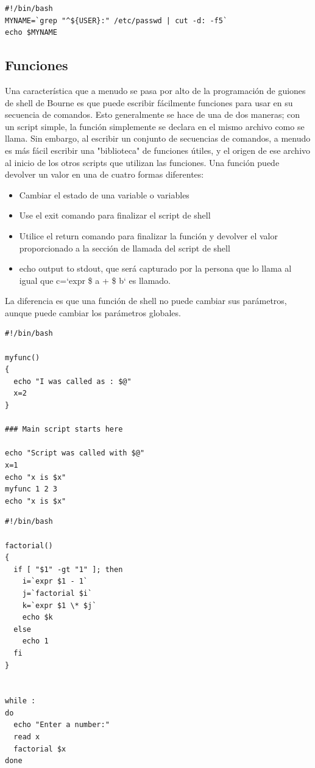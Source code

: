 \documentclass{article}
\begin{document}
\begin{verbatim}
#!/bin/bash
MYNAME=`grep "^${USER}:" /etc/passwd | cut -d: -f5`
echo $MYNAME
\end{verbatim}

\subsection{Funciones}
Una característica que a menudo se pasa por alto de la programación de guiones de shell de Bourne es que puede escribir fácilmente funciones para usar en su secuencia de comandos. Esto generalmente se hace de una de dos maneras; con un script simple, la función simplemente se declara en el mismo archivo como se llama. 
Sin embargo, al escribir un conjunto de secuencias de comandos, a menudo es más fácil escribir una "biblioteca" de funciones útiles, y el origen de ese archivo al inicio de los otros scripts que utilizan las funciones.
Una función puede devolver un valor en una de cuatro formas diferentes:
\begin{itemize}
\item Cambiar el estado de una variable o variables
\item Use el exit comando para finalizar el script de shell
\item Utilice el return comando para finalizar la función y devolver el valor proporcionado a la sección de llamada del script de shell
\item echo output to stdout, que será capturado por la persona que lo llama al igual que c=`expr \$ a + \$ b` es llamado.
\end{itemize}
La diferencia es que una función de shell no puede cambiar sus parámetros, aunque puede cambiar los parámetros globales.
\begin{verbatim}
#!/bin/bash

myfunc()
{
  echo "I was called as : $@"
  x=2
}

### Main script starts here

echo "Script was called with $@"
x=1
echo "x is $x"
myfunc 1 2 3
echo "x is $x"
\end{verbatim}
\begin{verbatim}
#!/bin/bash

factorial()
{
  if [ "$1" -gt "1" ]; then
    i=`expr $1 - 1`
    j=`factorial $i`
    k=`expr $1 \* $j`
    echo $k
  else
    echo 1
  fi
}


while :
do
  echo "Enter a number:"
  read x
  factorial $x
done
\end{verbatim}
\end{document}
